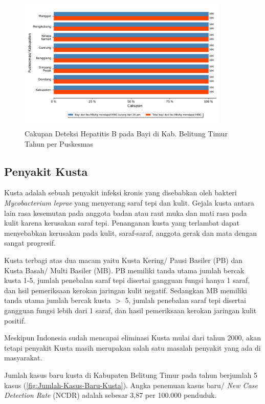\begin{figure}[H]
	\centering{}
	\includegraphics[width=0.9\textwidth]{bab_06/bab_06_05b_bayiHBIG}
	\caption{Cakupan Deteksi Hepatitis B pada Bayi di Kab. Belitung Timur Tahun \tP per Puskesmas}
	\label{fig:Cakupan-Bayi-HBIG}
\end{figure}

\subsection{Penyakit Kusta}
Kusta adalah sebuah penyakit infeksi kronis yang disebabkan oleh bakteri \emph{Mycobacterium leprae} yang menyerang saraf tepi dan kulit.
Gejala kusta antara lain rasa kesemutan pada anggota badan atau raut muka dan mati rasa pada kulit karena kerusakan saraf tepi.
Penanganan kusta yang terlambat dapat menyebabkan kerusakan pada kulit, saraf-saraf, anggota gerak dan mata dengan sangat progresif.

Kusta terbagi atas dua macam yaitu Kusta Kering/ Pausi Basiler (PB) dan Kusta Basah/ Multi Basiler (MB).
PB memiliki tanda utama jumlah bercak kusta 1-5, jumlah penebalan saraf tepi disertai gangguan fungsi hanya 1 saraf, dan hsil pemeriksaan kerokan jaringan kulit negatif.
Sedangkan MB memiliki tanda utama jumlah bercak kusta $>$ 5, jumlah penebalan saraf tepi disertai gangguan fungsi lebih dari 1 saraf, dan hasil pemeriksaan kerokan jaringan kulit positif.

Meskipun Indonesia sudah mencapai eliminasi Kusta mulai dari tahun 2000, akan tetapi penyakit Kusta masih merupakan salah satu masalah penyakit yang ada di masyarakat.

Jumlah kasus baru kusta di Kabupaten Belitung Timur pada tahun \tP berjumlah 5 kasus (\autoref{fig:Jumlah-Kasus-Baru-Kusta}).
Angka penemuan kasus baru/ \emph{New Case Detection Rate} (NCDR) adalah sebesar 3,87 per 100.000 penduduk.

